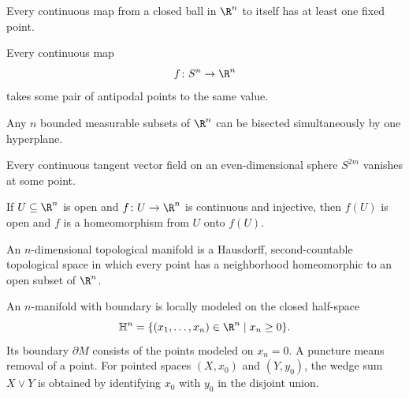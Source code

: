    \begin{theorem}
        Every continuous map from a closed ball in $\R^n$ to itself has at least
        one fixed point.
    \end{theorem}

    \begin{theorem}
        Every continuous map
        \[
            f\colon S^n\to\R^n
        \]
        takes some pair of antipodal points to the same value.
    \end{theorem}

    \begin{corollary}
        Any $n$ bounded measurable subsets of $\R^n$ can be bisected
        simultaneously by one hyperplane.
    \end{corollary}

    \begin{theorem}
        Every continuous tangent vector field on an even-dimensional sphere
        $S^{2m}$ vanishes at some point.
    \end{theorem}

    \begin{theorem}
        If $U\subseteq\R^n$ is open and $f\colon U\to\R^n$ is continuous and injective,
        then $f(U)$ is open and $f$ is a homeomorphism from $U$ onto $f(U)$.
    \end{theorem}

    \begin{definition}[Manifold]
        An $n$-dimensional topological manifold is a Hausdorff, second-countable
        topological space in which every point has a neighborhood homeomorphic
        to an open subset of $\R^n$.
    \end{definition}

    \begin{definition}
        An $n$-manifold with boundary is locally modeled on the closed
        half-space
        \[
            \mathbb{H}^n
            =
            \{(x_1,\dots,x_n)\in\R^n\mid x_n\geq0\}.
        \]
        Its boundary $\partial M$ consists of the points modeled on $x_n=0$.
        A puncture means removal of a point. For pointed spaces $(X,x_0)$ and
        $(Y,y_0)$, the wedge sum $X\vee Y$ is obtained by identifying $x_0$
        with $y_0$ in the disjoint union.
    \end{definition}


